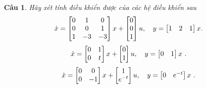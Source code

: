 \documentclass[11pt]{article}
\newtheorem{bt}{Câu}
\begin{document}
\begin{bt}
Hãy xét tính điều khiển được của các hệ điều khiển sau
%
\begin{equation}
	\dot{x} = \begin{bmatrix} 0 & 1 & 0 \\ 0 & 0 & 1 \\ 1 & -3 & -3 \end{bmatrix} x + \begin{bmatrix} 0 \\ 0 \\ 1 \end{bmatrix} u, \quad
	y = \begin{bmatrix} 1 & 2 & 1 \end{bmatrix} x. 
\end{equation}
%
%
\begin{equation}\label{1}
\dot{x} = \begin{bmatrix} 0 & 1 \\ 0 & t \end{bmatrix} x + \begin{bmatrix} 0 \\ 1 \end{bmatrix} u, \quad y = \begin{bmatrix} 0 & 1 \end{bmatrix} x \ .
\end{equation}
%
\begin{equation}\label{2}
	\dot{x} = \begin{bmatrix} 0 & 0 \\ 0 & -1 \end{bmatrix} x + \begin{bmatrix} 1 \\ e^{-t} \end{bmatrix} u, \quad y = \begin{bmatrix} 0 & e^{-t} \end{bmatrix} x \ .
\end{equation}
%

\end{bt}
	
	
\end{document}
